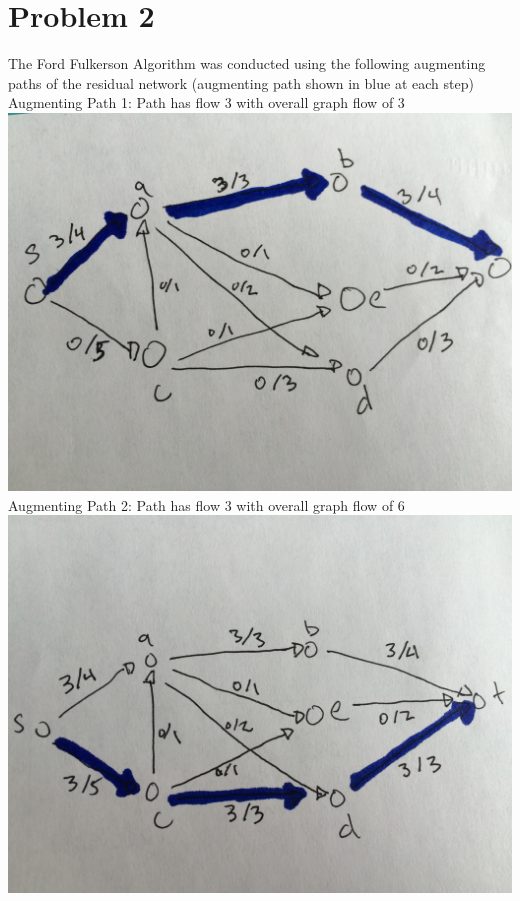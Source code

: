 \documentclass[11pt]{article}
\begin{document}
\section*{Problem 2}
The Ford Fulkerson Algorithm was conducted using the following augmenting paths of the residual network (augmenting path shown in blue at each step)\\

Augmenting Path 1: Path has flow 3 with overall graph flow of 3\\
\includegraphics[scale=.1]{IMG_5551.jpg} \\

Augmenting Path 2: Path has flow 3 with overall graph flow of 6\\
\includegraphics[scale=.1]{IMG_5552.jpg} \\
\end{document}
